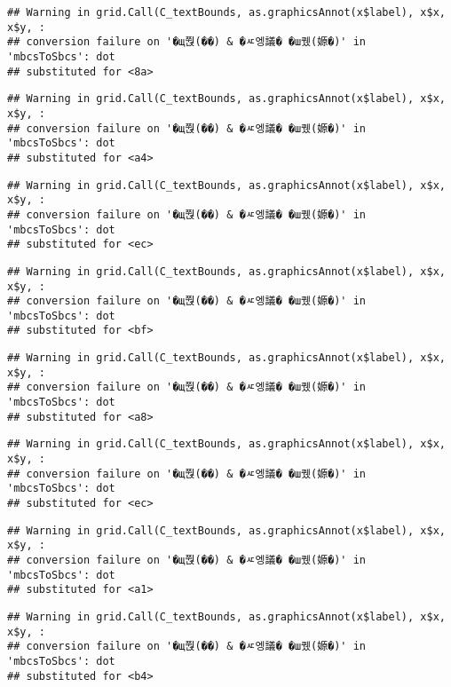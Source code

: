 \documentclass[
]{article}
\begin{document}
\begin{verbatim}
## Warning in grid.Call(C_textBounds, as.graphicsAnnot(x$label), x$x, x$y, :
## conversion failure on '�щ쭩(��) & �ㅼ엥議� �ш퀬(嫄�)' in 'mbcsToSbcs': dot
## substituted for <8a>
\end{verbatim}

\begin{verbatim}
## Warning in grid.Call(C_textBounds, as.graphicsAnnot(x$label), x$x, x$y, :
## conversion failure on '�щ쭩(��) & �ㅼ엥議� �ш퀬(嫄�)' in 'mbcsToSbcs': dot
## substituted for <a4>
\end{verbatim}

\begin{verbatim}
## Warning in grid.Call(C_textBounds, as.graphicsAnnot(x$label), x$x, x$y, :
## conversion failure on '�щ쭩(��) & �ㅼ엥議� �ш퀬(嫄�)' in 'mbcsToSbcs': dot
## substituted for <ec>
\end{verbatim}

\begin{verbatim}
## Warning in grid.Call(C_textBounds, as.graphicsAnnot(x$label), x$x, x$y, :
## conversion failure on '�щ쭩(��) & �ㅼ엥議� �ш퀬(嫄�)' in 'mbcsToSbcs': dot
## substituted for <bf>
\end{verbatim}

\begin{verbatim}
## Warning in grid.Call(C_textBounds, as.graphicsAnnot(x$label), x$x, x$y, :
## conversion failure on '�щ쭩(��) & �ㅼ엥議� �ш퀬(嫄�)' in 'mbcsToSbcs': dot
## substituted for <a8>
\end{verbatim}

\begin{verbatim}
## Warning in grid.Call(C_textBounds, as.graphicsAnnot(x$label), x$x, x$y, :
## conversion failure on '�щ쭩(��) & �ㅼ엥議� �ш퀬(嫄�)' in 'mbcsToSbcs': dot
## substituted for <ec>
\end{verbatim}

\begin{verbatim}
## Warning in grid.Call(C_textBounds, as.graphicsAnnot(x$label), x$x, x$y, :
## conversion failure on '�щ쭩(��) & �ㅼ엥議� �ш퀬(嫄�)' in 'mbcsToSbcs': dot
## substituted for <a1>
\end{verbatim}

\begin{verbatim}
## Warning in grid.Call(C_textBounds, as.graphicsAnnot(x$label), x$x, x$y, :
## conversion failure on '�щ쭩(��) & �ㅼ엥議� �ш퀬(嫄�)' in 'mbcsToSbcs': dot
## substituted for <b4>
\end{verbatim}
\end{document}
